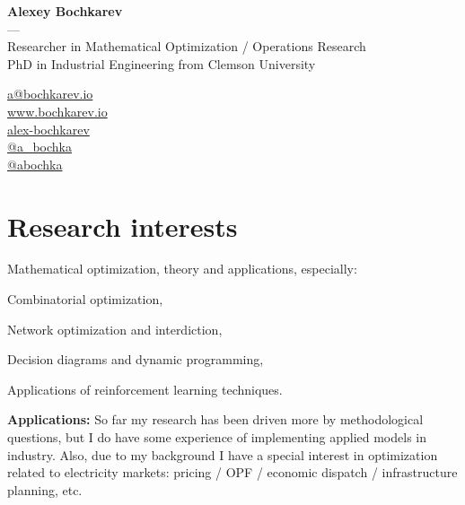 \documentclass[11pt]{article} \usepackage{geometry} %
\begin{document}
  \begin{minipage}[c]{0.74\textwidth}
    \centering
    {\LARGE \textbf{Alexey Bochkarev}}\\
    ---\\ 
    Researcher in Mathematical Optimization / Operations Research\\
    PhD in Industrial Engineering from Clemson University
  \end{minipage}\hfill%
  \begin{minipage}{0.26\textwidth}
    \faEnvelope \href{mailto:a@bochkarev.io}{a@bochkarev.io}\\
    \faGlobe \href{https://www.bochkarev.io}{www.bochkarev.io}\\
    \faGithub \href{https://github.com/alex-bochkarev}{alex-bochkarev}\\
    \faTwitter \href{https://twitter.com/a_bochka}{@a\_bochka}\\
    \faTelegram \href{https://t.me/abochka}{@abochka}
  \end{minipage}
  
  \vspace{1.0em}
  \section*{Research interests}
  Mathematical optimization, theory and applications, especially:\vspace{0.3em}
  \begin{itemize}
    \begin{minipage}{0.5\linewidth}
      \item Combinatorial optimization,
      \item Network optimization and interdiction,
    \end{minipage}
    \begin{minipage}{0.5\linewidth}
      \item Decision diagrams and dynamic programming,
      \item Applications of reinforcement learning techniques.
    \end{minipage}
  \end{itemize}

  \noindent
  \textbf{Applications:} So far my research has been driven more by
  methodological questions, but I do have some experience of
  implementing applied models in industry. Also, due to my background I have a
  special interest in optimization related to electricity markets:
  pricing / OPF / economic dispatch / infrastructure planning, etc.\vspace{1.5em}
\end{document}
